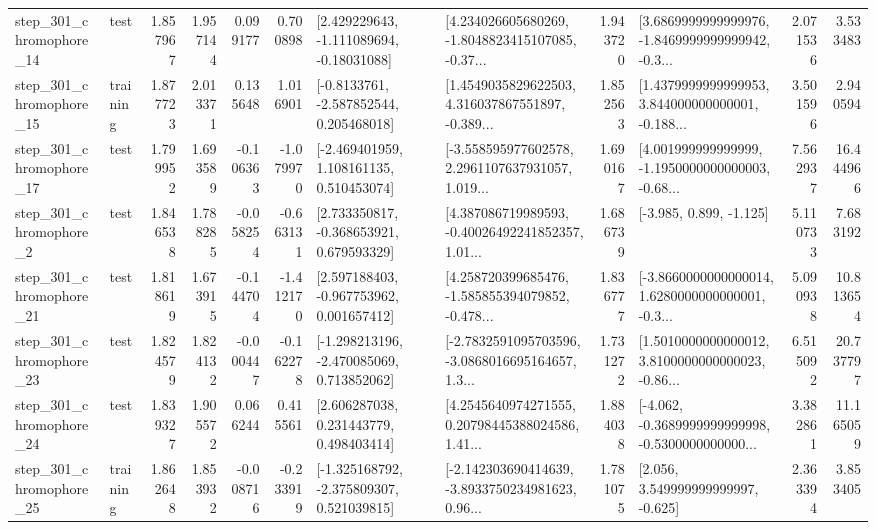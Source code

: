 \begin{tabular}{llrrrrllrlrr}
  step\_301\_chromophore\_14 &      test &      1.857967 &    1.957144 &      0.099177 &  0.700898 &    [2.429229643, -1.111089694, -0.18031088] &  [4.234026605680269, -1.8048823415107085, -0.37... &       1.943720 &  [3.6869999999999976, -1.8469999999999942, -0.3... &            2.071536 &          3.533483 \\
  step\_301\_chromophore\_15 &  training &      1.877723 &    2.013371 &      0.135648 &  1.016901 &     [-0.8133761, -2.587852544, 0.205468018] &  [1.4549035829622503, 4.316037867551897, -0.389... &       1.852563 &  [1.4379999999999953, 3.844000000000001, -0.188... &            3.501596 &          2.940594 \\
  step\_301\_chromophore\_17 &      test &      1.799952 &    1.693589 &     -0.106363 & -1.079970 &    [-2.469401959, 1.108161135, 0.510453074] &  [-3.558595977602578, 2.2961107637931057, 1.019... &       1.690167 &  [4.001999999999999, -1.1950000000000003, -0.68... &            7.562937 &         16.444966 \\
   step\_301\_chromophore\_2 &      test &      1.846538 &    1.788285 &     -0.058254 & -0.663131 &    [2.733350817, -0.368653921, 0.679593329] &  [4.387086719989593, -0.40026492241852357, 1.01... &       1.686739 &                            [-3.985, 0.899, -1.125] &            5.110733 &          7.683192 \\
  step\_301\_chromophore\_21 &      test &      1.818619 &    1.673915 &     -0.144704 & -1.412170 &    [2.597188403, -0.967753962, 0.001657412] &  [4.258720399685476, -1.585855394079852, -0.478... &       1.836777 &  [-3.8660000000000014, 1.6280000000000001, -0.3... &            5.090938 &         10.813654 \\
  step\_301\_chromophore\_23 &      test &      1.824579 &    1.824132 &     -0.000447 & -0.162278 &   [-1.298213196, -2.470085069, 0.713852062] &  [-2.7832591095703596, -3.0868016695164657, 1.3... &       1.731272 &  [1.5010000000000012, 3.8100000000000023, -0.86... &            6.515092 &         20.737797 \\
  step\_301\_chromophore\_24 &      test &      1.839327 &    1.905572 &      0.066244 &  0.415561 &     [2.606287038, 0.231443779, 0.498403414] &  [4.2545640974271555, 0.20798445388024586, 1.41... &       1.884038 &  [-4.062, -0.3689999999999998, -0.5300000000000... &            3.382861 &         11.165059 \\
  step\_301\_chromophore\_25 &  training &      1.862648 &    1.853932 &     -0.008716 & -0.233919 &   [-1.325168792, -2.375809307, 0.521039815] &  [-2.142303690414639, -3.8933750234981623, 0.96... &       1.781075 &                 [2.056, 3.549999999999997, -0.625] &            2.363394 &          3.853405 \\

\end{tabular}
